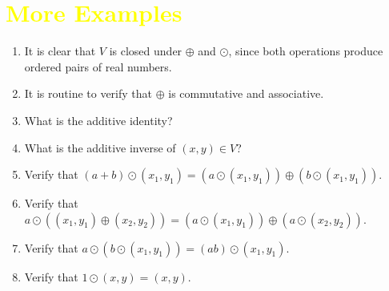 \documentclass[pdf,9pt]{beamer}
\begin{document}
\section[\textcolor{yellow}{}]{\textcolor{yellow}{More Examples}}
\begin{frame}[fragile]
 \begin{proofnoend}
    \begin{enumerate}
	\item It is clear that $V$ is closed under $\oplus$ and $\odot$, since
	  both operations produce ordered pairs of real numbers.
	  \pause
	\item It is routine to verify that $\oplus$ is commutative and associative.
	  \pause
	\item What is the additive identity?
	  \pause
	\item What is the additive inverse of $(x,y)\in V$?
	  \pause
	\item Verify that
	  $(a+b)\odot(x_1,y_1) =(a\odot(x_1,y_1)) \oplus (b\odot(x_1,y_1))$.
	  \pause
	\item Verify that
	  $a\odot((x_1,y_1)\oplus(x_2,y_2)) =(a\odot(x_1,y_1)) \oplus (a\odot(x_2,y_2))$.
	  \pause
	\item Verify that $a\odot(b\odot(x_1,y_1))=(ab)\odot(x_1,y_1)$.
	  \pause
	\item Verify that $1\odot(x,y)=(x,y)$. \myQED
    \end{enumerate}
\end{proofnoend}
\end{frame}
\end{document}
